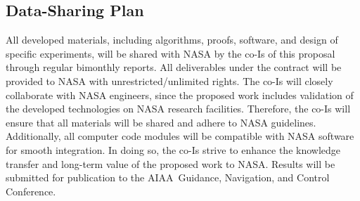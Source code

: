 \documentclass[letter,onecolumn,12pt]{aiaa-tc}
\begin{document}
\subsection{Data-Sharing Plan}
All developed materials, including algorithms, proofs, software, and design of specific experiments, will be shared with NASA by the co-Is of this proposal through regular bimonthly reports. All deliverables under the contract will be provided to NASA with unrestricted/unlimited rights. The co-Is will closely collaborate with NASA engineers, since the proposed work includes validation of the developed technologies on NASA research facilities. Therefore, the co-Is will ensure that all materials will be shared and adhere to NASA guidelines. Additionally, all computer code modules will be compatible with NASA software for smooth integration. In doing so, the co-Is strive to enhance the knowledge transfer and long-term value of the proposed work to NASA. Results will be submitted for publication to the AIAA~Guidance, Navigation, and Control Conference.


\clearpage
\thispagestyle{empty}
\end{document}
